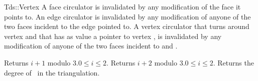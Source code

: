 \begin{ccClass}{Tds::Vertex}
A face circulator is invalidated by any modification of the face it
points to. An edge circulator is invalidated
by any modification of anyone of the two faces incident to the edge
pointed to.  A vertex circulator that turns around vertex 
and that has as value a pointer to vertex , is invalidated
by any modification of anyone of the two faces incident to 
and .

\ccGlue
{}
\ccGlue
{}


{Returns $i+1$ modulo 3.\ccPrecond $0\leq i \leq 2$.}
\ccGlue
{}
{Returns $i+2$ modulo 3.\ccPrecond $0\leq i \leq 2$.}
\ccGlue
{}
{Returns the degree of \ccVar\ in the triangulation.}

\end{ccClass}



